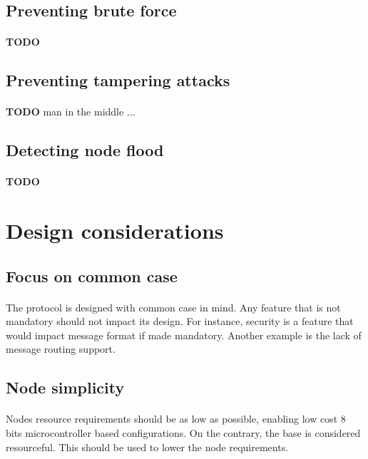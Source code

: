 \documentclass[a4paper, 11pt]{article}
\begin{document}
\subsection{Preventing brute force}
\paragraph{}
\textbf{TODO}

\subsection{Preventing tampering attacks}
\paragraph{}
\textbf{TODO} man in the middle ...

\subsection{Detecting node flood}
\paragraph{}
\textbf{TODO}


\clearpage
\section{Design considerations}

\subsection{Focus on common case}
\paragraph{}
The protocol is designed with common case in mind. Any feature that is not
mandatory should not impact its design. For instance, security is a feature
that would impact message format if made mandatory. Another example is the
lack of message routing support.

\subsection{Node simplicity}
\paragraph{}
Nodes resource requirements should be as low as possible, enabling low cost
8 bits microcontroller based configurations. On the contrary, the base is
considered resourceful. This should be used to lower the node requirements.
\end{document}
